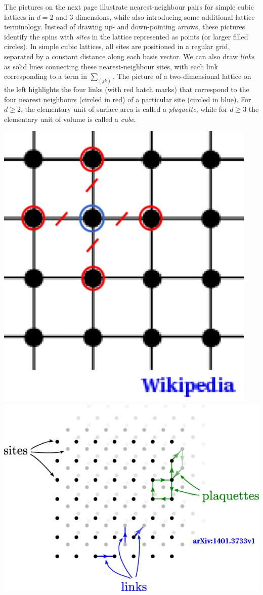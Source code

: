 The pictures on the next page illustrate nearest-neighbour pairs for simple cubic lattices in $d = 2$ and $3$ dimensions, while also introducing some additional lattice terminology.
Instead of drawing up- and down-pointing arrows, these pictures identify the spins with \textit{sites} in the lattice represented as points (or larger filled circles).
In simple cubic lattices, all sites are positioned in a regular grid, separated by a constant distance along each basis vector.
We can also draw \textit{links} as solid lines connecting these nearest-neighbour sites, with each link corresponding to a term in $\sum_{(jk)}$.
The picture of a two-dimensional lattice on the left highlights the four links (with red hatch marks) that correspond to the four nearest neighbours (circled in red) of a particular site (circled in blue).
For $d \geq 2$, the elementary unit of surface area is called a \textit{plaquette}, while for $d \geq 3$ the elementary unit of volume is called a \textit{cube}.

\begin{center}
  \includegraphics[height=0.4\textwidth]{figs/unit09_lattice_2d.pdf}\hfill
  \includegraphics[height=0.4\textwidth]{figs/unit09_lattice_3d.pdf}
\end{center}

